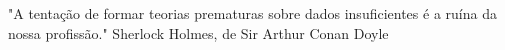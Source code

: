 \begin{dedica}  %

"A tentação de formar teorias prematuras sobre dados insuficientes é a ruína da nossa profissão." Sherlock Holmes, de Sir Arthur Conan Doyle

\end{dedica}
